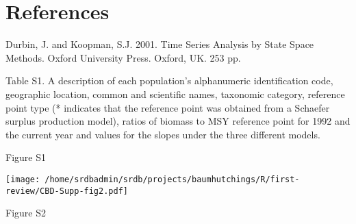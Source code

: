 \documentclass[letterpaper,12pt]{article}
\begin{document}
\section*{References}

Durbin, J. and Koopman, S.J. 2001. Time Series Analysis by State Space Methods. Oxford University Press. Oxford, UK. 253 pp.

\clearpage

\noindent Table S1. A description of each population's alphanumeric identification code, geographic location, common and scientific names, taxonomic category, reference point type (* indicates that the reference point was obtained from a Schaefer surplus production model), ratios of biomass to MSY reference point for 1992 and the current year and values for the slopes under the three different models.

\begin{landscape}
\begin{tiny}

\end{tiny}
\end{landscape}

\clearpage

\begin{center}

\end{center}
\noindent 
Figure S1

\clearpage

\begin{center}
\texttt{[image: /home/srdbadmin/srdb/projects/baumhutchings/R/first-review/CBD-Supp-fig2.pdf]}
\end{center}
\noindent 
Figure S2
\end{document}
